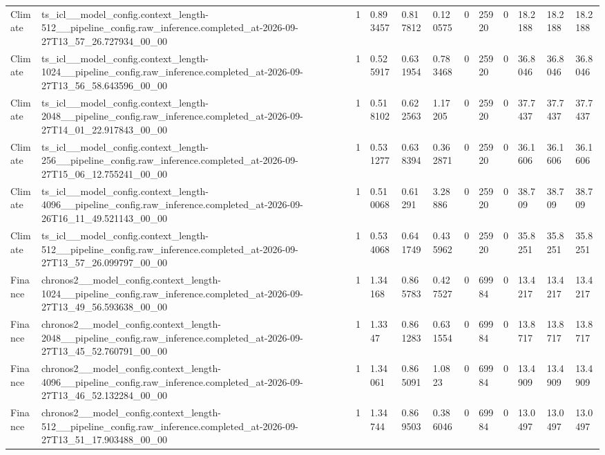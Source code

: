 \begin{tabular}{llllllllllll}
Climate & ts\_icl\_\_model\_config.context\_length-512\_\_pipeline\_config.raw\_inference.completed\_at-2026-09-27T13\_57\_26.727934\_00\_00 & 1 & 0.893457 & 0.817812 & 0.120575 & 0 & 25920 & 0 & 18.2188 & 18.2188 & 18.2188 \\
Climate & ts\_icl\_\_model\_config.context\_length-1024\_\_pipeline\_config.raw\_inference.completed\_at-2026-09-27T13\_56\_58.643596\_00\_00 & 1 & 0.525917 & 0.631954 & 0.783468 & 0 & 25920 & 0 & 36.8046 & 36.8046 & 36.8046 \\
Climate & ts\_icl\_\_model\_config.context\_length-2048\_\_pipeline\_config.raw\_inference.completed\_at-2026-09-27T14\_01\_22.917843\_00\_00 & 1 & 0.518102 & 0.622563 & 1.17205 & 0 & 25920 & 0 & 37.7437 & 37.7437 & 37.7437 \\
Climate & ts\_icl\_\_model\_config.context\_length-256\_\_pipeline\_config.raw\_inference.completed\_at-2026-09-27T15\_06\_12.755241\_00\_00 & 1 & 0.531277 & 0.638394 & 0.362871 & 0 & 25920 & 0 & 36.1606 & 36.1606 & 36.1606 \\
Climate & ts\_icl\_\_model\_config.context\_length-4096\_\_pipeline\_config.raw\_inference.completed\_at-2026-09-26T16\_11\_49.521143\_00\_00 & 1 & 0.510068 & 0.61291 & 3.28886 & 0 & 25920 & 0 & 38.709 & 38.709 & 38.709 \\
Climate & ts\_icl\_\_model\_config.context\_length-512\_\_pipeline\_config.raw\_inference.completed\_at-2026-09-27T13\_57\_26.099797\_00\_00 & 1 & 0.534068 & 0.641749 & 0.435962 & 0 & 25920 & 0 & 35.8251 & 35.8251 & 35.8251 \\
Finance & chronos2\_\_model\_config.context\_length-1024\_\_pipeline\_config.raw\_inference.completed\_at-2026-09-27T13\_49\_56.593638\_00\_00 & 1 & 1.34168 & 0.865783 & 0.427527 & 0 & 69984 & 0 & 13.4217 & 13.4217 & 13.4217 \\
Finance & chronos2\_\_model\_config.context\_length-2048\_\_pipeline\_config.raw\_inference.completed\_at-2026-09-27T13\_45\_52.760791\_00\_00 & 1 & 1.3347 & 0.861283 & 0.631554 & 0 & 69984 & 0 & 13.8717 & 13.8717 & 13.8717 \\
Finance & chronos2\_\_model\_config.context\_length-4096\_\_pipeline\_config.raw\_inference.completed\_at-2026-09-27T13\_46\_52.132284\_00\_00 & 1 & 1.34061 & 0.865091 & 1.0823 & 0 & 69984 & 0 & 13.4909 & 13.4909 & 13.4909 \\
Finance & chronos2\_\_model\_config.context\_length-512\_\_pipeline\_config.raw\_inference.completed\_at-2026-09-27T13\_51\_17.903488\_00\_00 & 1 & 1.34744 & 0.869503 & 0.386046 & 0 & 69984 & 0 & 13.0497 & 13.0497 & 13.0497 \\

\end{tabular}
